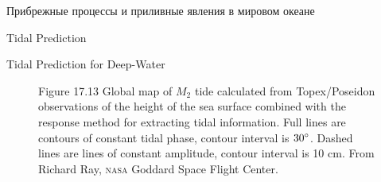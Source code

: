 \begin{chapter}{Прибрежные процессы и приливные явления в мировом океане}
\begin{section}{Tidal Prediction}
\begin{paragraph}{Tidal Prediction for Deep-Water}
\begin{figure}[t!]
\caption{Figure 17.13 Global map of $M_2$ tide calculated from
Topex/Poseidon observations of the
height of the sea surface combined with the response method for
extracting tidal information.  Full lines are contours of constant
tidal phase, contour interval is ${30}^\circ$. Dashed lines are
lines of constant amplitude, contour interval is 10 cm. From Richard
Ray, \textsc{nasa} Goddard Space Flight Center.}
\label{fig:m2_tide}
\end{figure}
%


\end{paragraph}
\end{section}
\end{chapter}

